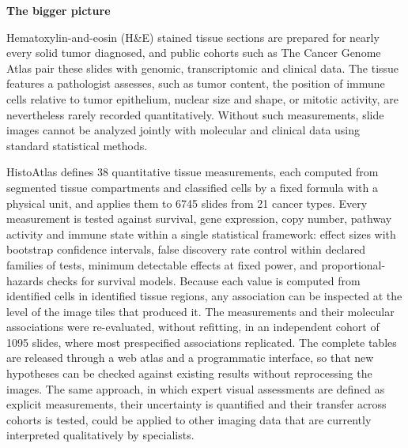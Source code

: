 \documentclass[preprint,review,12pt]{elsarticle}
\newenvironment{biggerpicture}
  {\setlength{\fboxsep}{10pt}%
   \begin{lrbox}{\bpbox}%
   \begin{minipage}{\dimexpr\textwidth-2\fboxsep-2\fboxrule\relax}%
   \textbf{\large The bigger picture}\par\vspace{0.5em}}
  {\end{minipage}\end{lrbox}%
   \par\vspace{0.8em}\noindent\fbox{\usebox{\bpbox}}\par\vspace{0.8em}}
\begin{document}
\begin{biggerpicture}
Hematoxylin-and-eosin (H\&E) stained tissue sections are prepared for nearly
every solid tumor diagnosed, and public cohorts such as The Cancer Genome Atlas
pair these slides with genomic, transcriptomic and clinical data. The tissue
features a pathologist assesses, such as tumor content, the position of immune
cells relative to tumor epithelium, nuclear size and shape, or mitotic activity,
are nevertheless rarely recorded quantitatively. Without such measurements, slide
images cannot be analyzed jointly with molecular and clinical data using standard
statistical methods.

HistoAtlas defines 38 quantitative tissue measurements, each computed from
segmented tissue compartments and classified cells by a fixed formula with a
physical unit, and applies them to \num{6745} slides from 21 cancer types. Every
measurement is tested against survival, gene expression, copy number, pathway
activity and immune state within a single statistical framework: effect sizes with
bootstrap confidence intervals, false discovery rate control within declared
families of tests, minimum detectable effects at fixed power, and
proportional-hazards checks for survival models. Because each value is computed
from identified cells in identified tissue regions, any association can be
inspected at the level of the image tiles that produced it. The measurements and
their molecular associations were re-evaluated, without refitting, in an
independent cohort of \num{1095} slides, where most prespecified associations
replicated. The complete tables are released through a web atlas and a
programmatic interface, so that new hypotheses can be checked against existing
results without reprocessing the images. The same approach, in which expert
visual assessments are defined as explicit measurements, their uncertainty is
quantified and their transfer across cohorts is tested, could be applied to other
imaging data that are currently interpreted qualitatively by specialists.
\end{biggerpicture}

\clearpage











\end{document}
